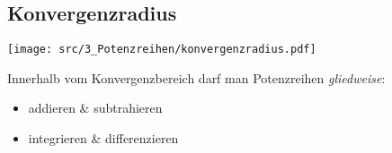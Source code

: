 \subsection{Konvergenzradius}
    \vspace{0.5em}
    \begin{center}
            \texttt{[image: src/3\_Potenzreihen/konvergenzradius.pdf]}
    \end{center}
    Innerhalb vom Konvergenzbereich darf man Potenzreihen \textit{gliedweise}:
    \begin{itemize}
        \item addieren \& subtrahieren
        \item integrieren \& differenzieren
    \end{itemize}